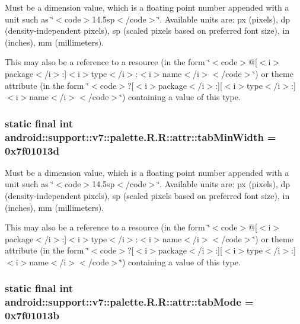 Must be a dimension value, which is a floating point number appended with a unit such as \char`\"{}$<$code$>$14.5sp$<$/code$>$\char`\"{}. Available units are: px (pixels), dp (density-independent pixels), sp (scaled pixels based on preferred font size), in (inches), mm (millimeters). 

This may also be a reference to a resource (in the form \char`\"{}$<$code$>$@\mbox{[}$<$i$>$package$<$/i$>$:\mbox{]}$<$i$>$type$<$/i$>$:$<$i$>$name$<$/i$>$$<$/code$>$\char`\"{}) or theme attribute (in the form \char`\"{}$<$code$>$?\mbox{[}$<$i$>$package$<$/i$>$:\mbox{]}\mbox{[}$<$i$>$type$<$/i$>$:\mbox{]}$<$i$>$name$<$/i$>$$<$/code$>$\char`\"{}) containing a value of this type. \hypertarget{classandroid_1_1support_1_1v7_1_1palette_1_1_r_1_1attr_d511e5b0f4d01428d15b9b1501c4aea2}{
\subsubsection[{tabMinWidth}]{\setlength{\rightskip}{0pt plus 5cm}static final int android::support::v7::palette.R.R::attr::tabMinWidth = 0x7f01013d}}
\label{classandroid_1_1support_1_1v7_1_1palette_1_1_r_1_1attr_d511e5b0f4d01428d15b9b1501c4aea2}


Must be a dimension value, which is a floating point number appended with a unit such as \char`\"{}$<$code$>$14.5sp$<$/code$>$\char`\"{}. Available units are: px (pixels), dp (density-independent pixels), sp (scaled pixels based on preferred font size), in (inches), mm (millimeters). 

This may also be a reference to a resource (in the form \char`\"{}$<$code$>$@\mbox{[}$<$i$>$package$<$/i$>$:\mbox{]}$<$i$>$type$<$/i$>$:$<$i$>$name$<$/i$>$$<$/code$>$\char`\"{}) or theme attribute (in the form \char`\"{}$<$code$>$?\mbox{[}$<$i$>$package$<$/i$>$:\mbox{]}\mbox{[}$<$i$>$type$<$/i$>$:\mbox{]}$<$i$>$name$<$/i$>$$<$/code$>$\char`\"{}) containing a value of this type. \hypertarget{classandroid_1_1support_1_1v7_1_1palette_1_1_r_1_1attr_34cca503f9ec9a37ccede7e957dcfb3c}{
\subsubsection[{tabMode}]{\setlength{\rightskip}{0pt plus 5cm}static final int android::support::v7::palette.R.R::attr::tabMode = 0x7f01013b}}
\label{classandroid_1_1support_1_1v7_1_1palette_1_1_r_1_1attr_34cca503f9ec9a37ccede7e957dcfb3c}


